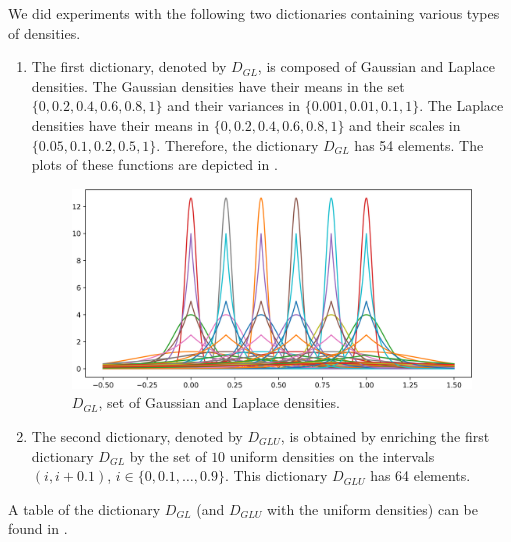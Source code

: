 We did experiments with the following two dictionaries containing various types of densities.
\begin{enumerate}
\item The first dictionary, denoted by $D_{GL}$, is composed of Gaussian and Laplace densities. 
The Gaussian densities have their means in the set 
$\{0, 0.2, 0.4, 0.6, 0.8, 1\}$ and their variances in $\{0.001, 0.01, 0.1, 1\}$. The Laplace densities have their 
means in $\{0, 0.2, 0.4, 0.6, 0.8, 1\}$ and their scales in $\{0.05, 0.1, 0.2, 0.5, 1\}$. Therefore, 
the dictionary $D_{GL}$ has 54 elements. The plots of these
functions are depicted in .

\begin{figure}[h]
\centering
\includegraphics[width=1\textwidth]{TeX_files/lapl_gauss_dict.png}
\caption{$D_{GL}$, set of Gaussian and Laplace densities.}
\label{fig:dict}
\end{figure}
\item The second dictionary, denoted by $D_{GLU}$, is obtained by enriching
the first dictionary $D_{GL}$ by the set of $10$ uniform densities on the intervals 
$(i, i+0.1)$, $i\in \{0, 0.1,\dots,0.9\}$. This dictionary $D_{GLU}$ has 64 elements.
\end{enumerate}
A table of the dictionary $D_{GL}$ (and $D_{GLU}$ with the uniform densities) can be found in .

